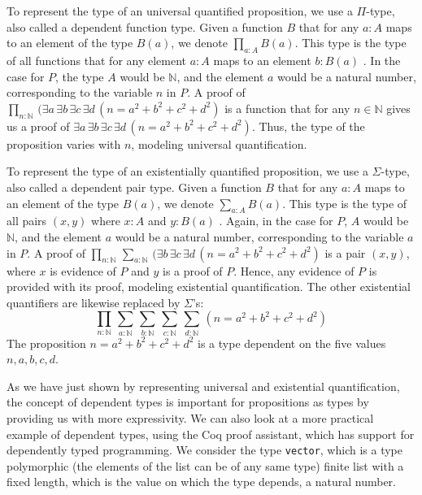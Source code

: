 To represent the type of an universal quantified proposition,
we use a $\Pi$-type, also called a dependent function type.
Given a function $B$ that for any $a : A$ maps to an
element of the type $B(a)$, we denote $\prod_{a : A} B(a)$.
This type is the type of all functions that for any element
$a : A$ maps to an element $b : B(a)$ \cite[p.~78] {lof1}.
In the case for $P$, the type $A$ would be $\mathbb{N}$,
and the element $a$ would be a natural number, corresponding to the variable $n$ in $P$.
A proof of $\prod_{n : \mathbb{N}} \, (\exists a \, \exists b \, \exists c \, \exists d \, (n = a^2 + b^2 + c^2 + d^2)$
is a function that for any $n \in \mathbb{N}$
gives us a proof of $\exists a \, \exists b \, \exists c \, \exists d \, (n = a^2 + b^2 + c^2 + d^2)$.
Thus, the type of the proposition varies with $n$,
modeling universal quantification.

To represent the type of an existentially quantified proposition,
we use a $\Sigma$-type, also called a dependent pair type.
Given a function $B$ that for any $a : A$ maps to an
element of the type $B(a)$, we denote $\sum_{a : A} B(a)$.
This type is the type of all pairs $(x, y)$ where
$x : A$ and $y : B(a)$ \cite[p.~79]{lof1}.
Again, in the case for $P$, $A$ would be $\mathbb{N}$,
and the element $a$ would be a natural number, corresponding to the variable $a$ in $P$.
A proof of $\prod_{n : \mathbb{N}} \, \sum_{a : \mathbb{N}} \, (\exists b \, \exists c \, \exists d \, (n = a^2 + b^2 + c^2 + d^2)$
is a pair $(x, y)$, where $x$ is evidence of $P$
and $y$ is a proof of $P$.
Hence, any evidence of $P$ is provided with its proof,
modeling existential quantification.
The other existential quantifiers are likewise replaced by $\Sigma$'s:
$$
\prod_{n : \mathbb{N}} \, \sum_{a : \mathbb{N}} \, \sum_{b : \mathbb{N}} \, \sum_{c : \mathbb{N}} \, \sum_{d : \mathbb{N}} \, (n = a^2 + b^2 + c^2 + d^2)
$$
The proposition $n = a^2 + b^2 + c^2 + d^2$ is a type dependent on the five values $n, a, b, c, d$.

As we have just shown by representing universal and existential quantification,
the concept of dependent types is important for propositions as types
by providing us with more expressivity.
We can also look at a more practical example of dependent types,
using the Coq proof assistant, which has support for dependently typed programming.
We consider the type \lstinline{vector}, which is a type polymorphic (the elements of the list can be of any same type)
finite list with a fixed length, which is the value on which the type depends, a natural number.

